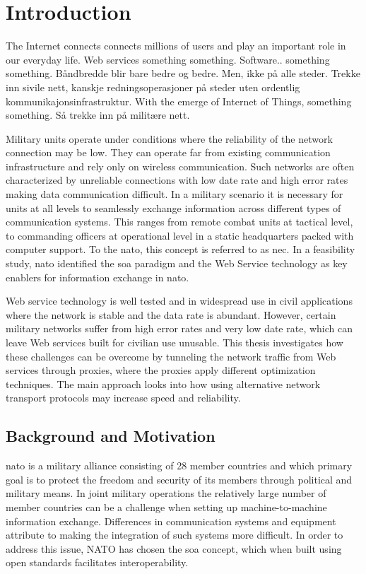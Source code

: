 
\chapter{Introduction}

The Internet connects connects millions of users and play an important role in
our everyday life. Web services something something. Software.. something
something. Båndbredde blir bare bedre og bedre. Men, ikke på alle steder. Trekke
inn sivile nett, kanskje redningsoperasjoner på steder uten ordentlig
kommunikajonsinfrastruktur. With the emerge of Internet of Things, something
something. Så trekke inn på militære nett.

Military units operate under conditions where the reliability of the network
connection may be low. They can operate far from existing communication
infrastructure and rely only on wireless communication. Such networks are often
characterized by unreliable connections with low date rate and high error rates
making data communication difficult. In a military scenario it is necessary for
units at all levels to seamlessly exchange information across different types of
communication systems. This ranges from remote combat units at tactical level,
to commanding officers at operational level in a static headquarters packed with
computer support. To the \gls{nato}, this concept is referred to as \gls{nec}.
In a feasibility study, \gls{nato} identified the \gls{soa} paradigm and the Web
Service technology as key enablers for information exchange in
\gls{nato}\cite{nnec-study}.

Web service technology is well tested and in widespread use in civil
applications where the network is stable and the data rate is abundant. However,
certain military networks suffer from high error rates and very low date rate,
which can leave Web services built for civilian use unusable. This thesis
investigates how these challenges can be overcome by tunneling the network
traffic from Web services through proxies, where the proxies apply different
optimization techniques. The main approach looks into how using alternative
network transport protocols may increase speed and reliability.

\section{Background and Motivation}

\gls{nato} is a military alliance consisting of 28 member countries
\cite{nato-homepage-member-countries} and which primary goal is to protect the
freedom and security of its members through political and military means. In
joint military operations the relatively large number of member countries can be
a challenge when setting up machine-to-machine information exchange. Differences
in communication systems and equipment attribute to making the integration of
such systems more difficult. In order to address this issue, NATO has chosen the
\gls{soa} concept, which when built using open standards facilitates
interoperability\cite{nnec-study}.

